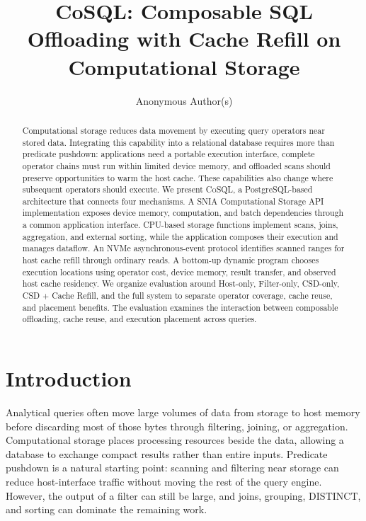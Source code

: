 \documentclass[sigconf, nonacm]{acmart}
\newcommand{\sys}{\textsc{CoSQL}}
\begin{document}
\title{CoSQL: Composable SQL Offloading with Cache Refill on Computational Storage}
\author{Anonymous Author(s)}
\renewcommand{\shortauthors}{Anonymous Author(s)}

\begin{abstract}
Computational storage reduces data movement by executing query operators near
stored data. Integrating this capability into a relational database requires
more than predicate pushdown: applications need a portable execution interface,
complete operator chains must run within limited device memory, and offloaded
scans should preserve opportunities to warm the host cache. These capabilities
also change where subsequent operators should execute. We present \sys{},
a PostgreSQL-based architecture that connects four mechanisms. A SNIA
Computational Storage API implementation exposes device memory, computation,
and batch dependencies through a common application interface. CPU-based
storage functions implement scans, joins, aggregation, and external sorting,
while the application composes their execution and manages dataflow. An NVMe
asynchronous-event protocol identifies scanned ranges for host cache refill
through ordinary reads. A bottom-up dynamic program chooses execution
locations using operator cost, device memory, result transfer, and observed
host cache residency. We organize evaluation around Host-only, Filter-only,
CSD-only, CSD + Cache Refill, and the full system to separate operator coverage,
cache reuse, and placement benefits. The evaluation examines the interaction between composable offloading,
cache reuse, and execution placement across queries.
\end{abstract}
\maketitle
\vldbtopmatter

\section{Introduction}
Analytical queries often move large volumes of data from storage to host
memory before discarding most of those bytes through filtering, joining, or
aggregation. Computational storage places processing resources beside the
data, allowing a database to exchange compact results rather than entire
inputs. Predicate pushdown is a natural starting point: scanning and filtering
near storage can reduce host-interface traffic without moving the rest of the
query engine. However, the output of a filter can still be large, and joins,
grouping, DISTINCT, and sorting can dominate the remaining work.
\end{document}
